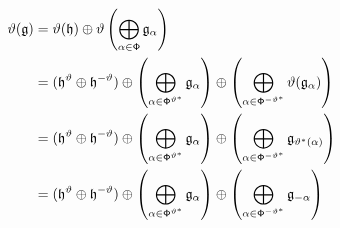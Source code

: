             $$
                \begin{aligned}
                    \vartheta(\mathfrak{g}) & = \vartheta(\mathfrak{h}) \oplus \vartheta\left( \bigoplus_{\alpha \in \mathsf{\Phi}} \mathfrak{g}_{\alpha} \right)
                    \\
                    & = (\mathfrak{h}^{\vartheta} \oplus \mathfrak{h}^{-\vartheta}) \oplus \left( \bigoplus_{\alpha \in \mathsf{\Phi}^{\vartheta^*}} \mathfrak{g}_{\alpha} \right) \oplus \left( \bigoplus_{\alpha \in \mathsf{\Phi}^{-\vartheta^*}} \vartheta(\mathfrak{g}_{\alpha}) \right)
                    \\
                    & = (\mathfrak{h}^{\vartheta} \oplus \mathfrak{h}^{-\vartheta}) \oplus \left( \bigoplus_{\alpha \in \mathsf{\Phi}^{\vartheta^*}} \mathfrak{g}_{\alpha} \right) \oplus \left( \bigoplus_{\alpha \in \mathsf{\Phi}^{-\vartheta^*}} \mathfrak{g}_{\vartheta^*(\alpha)} \right)
                    \\
                    & = (\mathfrak{h}^{\vartheta} \oplus \mathfrak{h}^{-\vartheta}) \oplus \left( \bigoplus_{\alpha \in \mathsf{\Phi}^{\vartheta^*}} \mathfrak{g}_{\alpha} \right) \oplus \left( \bigoplus_{\alpha \in \mathsf{\Phi}^{-\vartheta^*}} \mathfrak{g}_{-\alpha} \right)
                \end{aligned}
            $$

